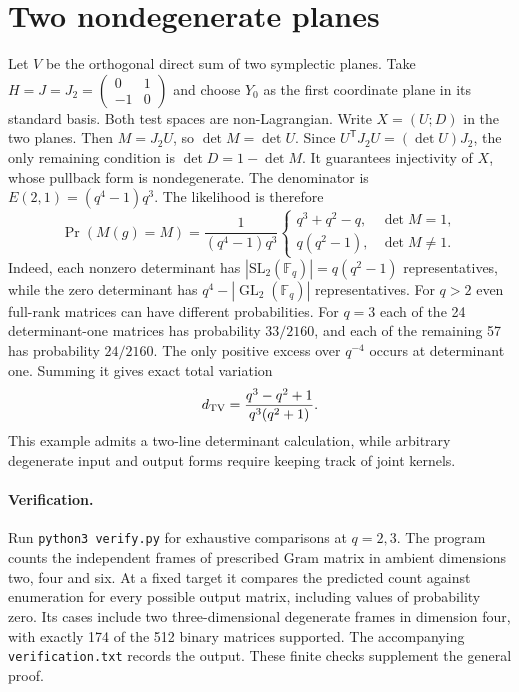 \documentclass[10pt]{article}
\DeclareMathOperator{\GL}{GL}
\newcommand{\F}{\mathbb F_q}
\begin{document}
\section{Two nondegenerate planes}

Let $V$ be the orthogonal direct sum of two symplectic planes. Take $H=J=J_2=\left(\begin{smallmatrix}0&1\\-1&0\end{smallmatrix}\right)$ and choose $Y_0$ as the first coordinate plane in its standard basis. Both test spaces are non-Lagrangian. Write $X=(U;D)$ in the two planes. Then $M=J_2U$, so $\det M=\det U$. Since $U^{\mathsf T}J_2U=(\det U)J_2$, the only remaining condition is $\det D=1-\det M$. It guarantees injectivity of $X$, whose pullback form is nondegenerate. The denominator is $E(2,1)=(q^4-1)q^3$. The likelihood is therefore
\[
 \Pr(M(g)=M)=\frac{1}{(q^4-1)q^3}
 \begin{cases}
 q^3+q^2-q,&\det M=1,\\
 q(q^2-1),&\det M\ne1 .
 \end{cases}
\]
Indeed, each nonzero determinant has $|\mathrm{SL}_2(\F)|=q(q^2-1)$ representatives, while the zero determinant has $q^4-|\GL_2(\F)|$ representatives. For $q>2$ even full-rank matrices can have different probabilities. For $q=3$ each of the 24 determinant-one matrices has probability $33/2160$, and each of the remaining 57 has probability $24/2160$. The only positive excess over $q^{-4}$ occurs at determinant one. Summing it gives exact total variation
\[
 d_{\rm TV}=\frac{q^3-q^2+1}{q^3(q^2+1)} .
\]
This example admits a two-line determinant calculation, while arbitrary degenerate input and output forms require keeping track of joint kernels.

\paragraph{Verification.}
Run \texttt{python3 verify.py} for exhaustive comparisons at $q=2,3$. The program counts the independent frames of prescribed Gram matrix in ambient dimensions two, four and six. At a fixed target it compares the predicted count against enumeration for every possible output matrix, including values of probability zero. Its cases include two three-dimensional degenerate frames in dimension four, with exactly 174 of the 512 binary matrices supported. The accompanying \texttt{verification.txt} records the output. These finite checks supplement the general proof.
\end{document}
